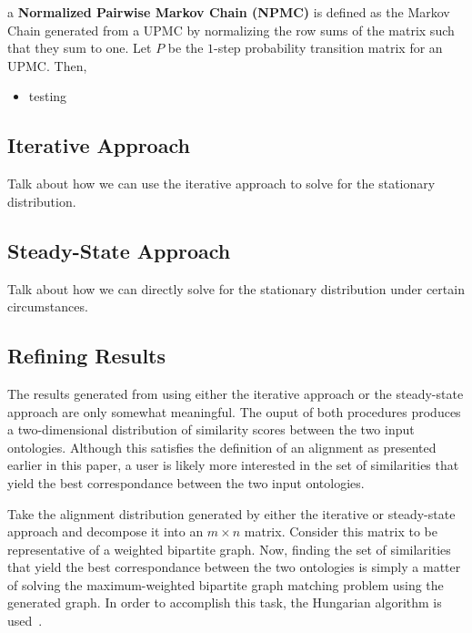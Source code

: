 \documentclass[letterpaper,twocolumn,12pt]{article}
\begin{document}
\begin{defn}
a {\bf Normalized Pairwise Markov Chain (NPMC)} is defined as the Markov Chain generated from a UPMC by normalizing the row sums of the matrix such that they sum to one. Let $P$ be the $1$-step probability transition matrix for an UPMC. Then,

\begin{itemize}
\item testing
\end{itemize}

\end{defn}

\subsection{Iterative Approach}

Talk about how we can use the iterative approach to solve for the stationary distribution.

\subsection{Steady-State Approach}

Talk about how we can directly solve for the stationary distribution under certain circumstances.

\subsection{Refining Results}

The results generated from using either the iterative approach or the steady-state approach are only somewhat meaningful.
The ouput of both procedures produces a two-dimensional distribution of similarity scores between the two input ontologies.
Although this satisfies the definition of an alignment as presented earlier in this paper, a user is likely more interested in the set of similarities that yield the best correspondance between the two input ontologies.

Take the alignment distribution generated by either the iterative or steady-state approach and decompose it into an $m \times n$ matrix.
Consider this matrix to be representative of a weighted bipartite graph.
Now, finding the set of similarities that yield the best correspondance between the two ontologies is simply a matter of solving the maximum-weighted bipartite graph matching problem using the generated graph.
In order to accomplish this task, the Hungarian algorithm is used~\cite{kuhn:1955:hungarian}.
\end{document}
